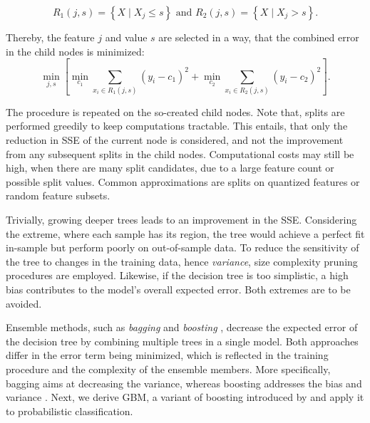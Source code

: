 \begin{equation}
    R_1(j, s)=\left\{X \mid X_j \leq s\right\} \text { and } R_2(j, s)=\left\{X \mid X_j>s\right\}.
\end{equation}

Thereby, the feature $j$ and value $s$ are selected in a way, that the combined error in the child nodes is minimized:
\begin{equation}
    \min _{j, s}\left[\min _{c_1} \sum_{x_i \in R_1(j, s)}\left(y_i-c_1\right)^2+\min _{c_2} \sum_{x_i \in R_2(j, s)}\left(y_i-c_2\right)^2\right].
\end{equation}

The procedure is repeated on the so-created child nodes. Note that, splits are performed greedily to keep computations tractable. This entails, that only the reduction in \gls{SSE} of the current node is considered, and not the improvement from any subsequent splits in the child nodes. Computational costs may still be high, when there are many split candidates, due to a large feature count or possible split values. Common approximations are splits on quantized features or random feature subsets.

Trivially, growing deeper trees leads to an improvement in the \gls{SSE}. Considering the extreme, where each sample has its region, the tree would achieve a perfect fit in-sample but perform poorly on out-of-sample data. To reduce the sensitivity of the tree to changes in the training data, hence \emph{variance}, size complexity pruning procedures are employed. Likewise, if the decision tree is too simplistic, a high bias contributes to the model's overall expected error. Both extremes are to be avoided.

Ensemble methods, such as \emph{bagging} \autocite[][123]{breimanBaggingPredictors1996} and \emph{boosting} \autocite[][197--227]{schapireStrengthWeakLearnability1990}, decrease the expected error of the decision tree by combining multiple trees in a single model. Both approaches differ in the error term being minimized, which is reflected in the training procedure and the complexity of the ensemble members. More specifically, bagging aims at decreasing the variance, whereas boosting addresses the bias and variance \autocites[][1672]{schapireBoostingMarginNew1998}[][29]{breimanRandomForests2001}. Next, we derive \gls{GBM}, a variant of boosting introduced by \textcite[][9]{friedmanGreedyFunctionApproximation2001} and apply it to probabilistic classification.

